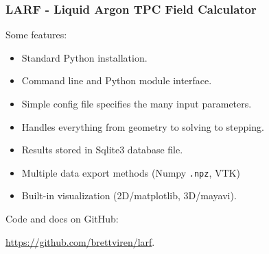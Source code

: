 \documentclass[xcolor=dvipsnames]{beamer}
\begin{document}
\begin{frame}[fragile]
  \frametitle{LARF - \textbf{L}iquid \textbf{Ar}gon TPC \textbf{F}ield Calculator}

  Some features:
  \begin{itemize}
  \item Standard Python installation.
  \item Command line and Python module interface.
  \item Simple config file specifies the many input parameters.
  \item Handles everything from geometry to solving to stepping.
  \item Results stored in Sqlite3 database file.
  \item Multiple data export methods (Numpy \texttt{.npz}, VTK)
  \item Built-in visualization (2D/matplotlib, 3D/mayavi).
  \end{itemize}

  Code and docs on GitHub:
  \begin{center}
    \url{https://github.com/brettviren/larf}.    
  \end{center}
\end{frame}
\end{document}
